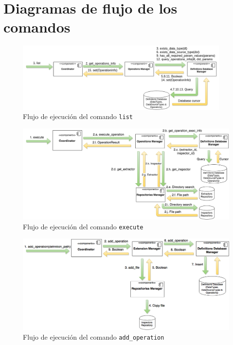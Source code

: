 \chapter{Diagramas de flujo de los comandos}
\label{diagramasFlujo}
\begin{figure}[H]
    \begin{center}
        \includegraphics[width=0.95\textwidth]{figures/list_operations}
        \caption{Flujo de ejecución del comando \texttt{list}}
    \end{center}
\end{figure}

\begin{figure}[H]
    \begin{center}
        \includegraphics[width=\textwidth]{figures/execute_operations}
        \caption{Flujo de ejecución del comando \texttt{execute}}
    \end{center}
\end{figure}

\begin{figure}[H]
    \begin{center}
        \includegraphics[width=\textwidth]{figures/add_operation}
        \caption{Flujo de ejecución del comando \texttt{add\_operation}}
    \end{center}
\end{figure}

